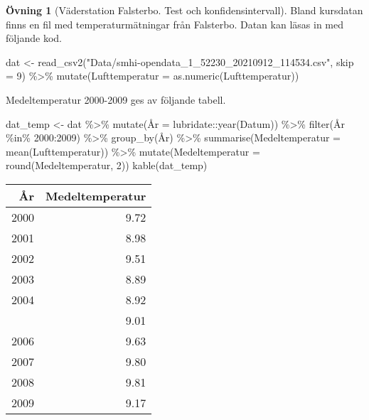 \documentclass[
]{book}
\newenvironment{Shaded}{\begin{snugshade}}{\end{snugshade}}
\newcommand{\AttributeTok}[1]{\textcolor[rgb]{0.77,0.63,0.00}{#1}}
\newcommand{\DecValTok}[1]{\textcolor[rgb]{0.00,0.00,0.81}{#1}}
\newcommand{\FunctionTok}[1]{\textcolor[rgb]{0.00,0.00,0.00}{#1}}
\newcommand{\NormalTok}[1]{#1}
\newcommand{\OtherTok}[1]{\textcolor[rgb]{0.56,0.35,0.01}{#1}}
\newcommand{\SpecialCharTok}[1]{\textcolor[rgb]{0.00,0.00,0.00}{#1}}
\newcommand{\StringTok}[1]{\textcolor[rgb]{0.31,0.60,0.02}{#1}}
\theoremstyle{definition}
\theoremstyle{definition}
\theoremstyle{definition}
\newtheorem{exercise}{Övning}[chapter]
\theoremstyle{definition}
\theoremstyle{remark}
\begin{document}
\begin{exercise}[Väderstation Falsterbo. Test och konfidensintervall]
Bland kursdatan finns en fil med temperaturmätningar från Falsterbo. Datan kan läsas in med följande kod.

\begin{Shaded}
\begin{Highlighting}[]
\NormalTok{dat }\OtherTok{\textless{}{-}} \FunctionTok{read\_csv2}\NormalTok{(}\StringTok{"Data/smhi{-}opendata\_1\_52230\_20210912\_114534.csv"}\NormalTok{, }\AttributeTok{skip =} \DecValTok{9}\NormalTok{) }\SpecialCharTok{\%\textgreater{}\%} 
  \FunctionTok{mutate}\NormalTok{(}\AttributeTok{Lufttemperatur =} \FunctionTok{as.numeric}\NormalTok{(Lufttemperatur))}
\end{Highlighting}
\end{Shaded}

Medeltemperatur 2000-2009 ges av följande tabell.

\begin{Shaded}
\begin{Highlighting}[]
\NormalTok{dat\_temp }\OtherTok{\textless{}{-}}\NormalTok{ dat }\SpecialCharTok{\%\textgreater{}\%} 
  \FunctionTok{mutate}\NormalTok{(Å}\AttributeTok{r =}\NormalTok{ lubridate}\SpecialCharTok{::}\FunctionTok{year}\NormalTok{(Datum)) }\SpecialCharTok{\%\textgreater{}\%} 
  \FunctionTok{filter}\NormalTok{(År }\SpecialCharTok{\%in\%} \DecValTok{2000}\SpecialCharTok{:}\DecValTok{2009}\NormalTok{) }\SpecialCharTok{\%\textgreater{}\%} 
  \FunctionTok{group\_by}\NormalTok{(År) }\SpecialCharTok{\%\textgreater{}\%} 
  \FunctionTok{summarise}\NormalTok{(}\AttributeTok{Medeltemperatur =} \FunctionTok{mean}\NormalTok{(Lufttemperatur)) }\SpecialCharTok{\%\textgreater{}\%} 
  \FunctionTok{mutate}\NormalTok{(}\AttributeTok{Medeltemperatur =} \FunctionTok{round}\NormalTok{(Medeltemperatur, }\DecValTok{2}\NormalTok{))}
\FunctionTok{kable}\NormalTok{(dat\_temp)}
\end{Highlighting}
\end{Shaded}

\begin{table}
\centering
\begin{tabular}[t]{rr}
\toprule
År & Medeltemperatur\\
\midrule
2000 & 9.72\\
2001 & 8.98\\
2002 & 9.51\\
2003 & 8.89\\
2004 & 8.92\\
\addlinespace
2005 & 9.01\\
2006 & 9.63\\
2007 & 9.80\\
2008 & 9.81\\
2009 & 9.17\\
\bottomrule
\end{tabular}
\end{table}


\end{exercise}
\end{document}
